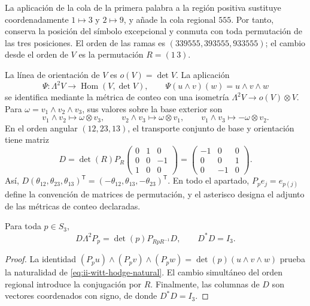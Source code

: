 La aplicación de la cola de la primera palabra a la región positiva
sustituye coordenadamente \(1\mapsto3\) y \(2\mapsto9\), y añade
la cola regional \(555\). Por tanto, conserva la posición del símbolo
excepcional y conmuta con toda permutación de las tres posiciones. El orden
de las ramas es \((339555,393555,933555)\); el cambio desde el orden de
\(V\) es la permutación \(R=(1\,3)\).

La línea de orientación de \(V\) es \(o(V)=\det V\). La aplicación
\begin{equation}
 \Psi:\Lambda^2V\longrightarrow\operatorname{Hom}(V,\det V),
 \qquad \Psi(u\wedge v)(w)=u\wedge v\wedge w
 \label{eq:ii-witt-hodge-natural}
\end{equation}
se identifica mediante la métrica de conteo con una isometría
\(\Lambda^2V\to o(V)\otimes V\). Para
\(\omega=v_1\wedge v_2\wedge v_3\), sus valores sobre la base exterior
son
\[
 v_1\wedge v_2\mapsto\omega\otimes v_3,
 \qquad v_2\wedge v_3\mapsto\omega\otimes v_1,
 \qquad v_1\wedge v_3\mapsto-\omega\otimes v_2.
\]
En el orden angular \((12,23,13)\), el transporte conjunto de base y
orientación tiene matriz
\begin{equation}
 D=\det(R)P_R
 \begin{pmatrix}0&1&0\\0&0&-1\\1&0&0\end{pmatrix}
 =\begin{pmatrix}-1&0&0\\0&0&1\\0&-1&0\end{pmatrix}.
 \label{eq:ii-witt-orientation-D}
\end{equation}
Así,
\(D(\theta_{12},\theta_{23},\theta_{13})^{\mathsf T}
=(-\theta_{12},\theta_{13},-\theta_{23})^{\mathsf T}\).
En todo el apartado, \(P_p e_j=e_{p(j)}\) define la convención de
matrices de permutación, y el asterisco designa el adjunto de las métricas
de conteo declaradas.

\begin{proposition}
\label{prop:ii-witt-D-natural}
Para toda \(p\in S_3\),
\[
 D\Lambda^2P_p=\det(p)P_{RpR^{-1}}D,
 \qquad D^*D=I_3.
\]
\end{proposition}
\begin{proof}
La identidad
\((P_pu)\wedge(P_pv)\wedge(P_pw)=\det(p)(u\wedge v\wedge w)\)
prueba la naturalidad de \eqref{eq:ii-witt-hodge-natural}. El cambio
simultáneo del orden regional introduce la conjugación por \(R\).
Finalmente, las columnas de \(D\) son vectores coordenados con signo,
de donde \(D^*D=I_3\).
\end{proof}

